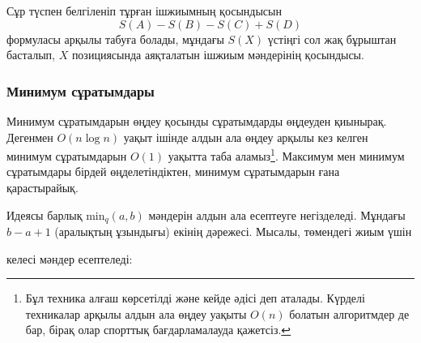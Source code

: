 Сұр түспен белгіленіп тұрған ішжиымның қосындысын
\[S(A) - S(B) - S(C) + S(D)\]
формуласы арқылы табуға болады,
мұндағы $S(X)$ үстіңгі сол жақ бұрыштан басталып,
$X$ позициясында аяқталатын ішжиым мәндерінің қосындысы. 

\subsubsection{Минимум сұратымдары}


Минимум сұратымдарын өңдеу қосынды сұратымдарды 
өңдеуден қиынырақ. Дегенмен $O(n \log n)$ уақыт ішінде
алдын ала өңдеу арқылы кез келген минимум сұратымдарын $O(1)$
уақытта таба аламыз\footnote{Бұл техника алғаш 
\cite{ben00} көрсетілді және кейде 
 әдісі деп аталады.
Күрделі техникалар \cite{fis06} арқылы алдын 
ала өңдеу уақыты $O(n)$ болатын алгоритмдер де бар, бірақ олар
спорттық бағдарламалауда қажетсіз.}.
Максимум мен минимум сұратымдары бірдей өңделетіндіктен,
минимум сұратымдарын ғана қарастырайық.

Идеясы барлық $\textrm{min}_q(a,b)$ мәндерін 
алдын ала есептеуге негізделеді. Мұндағы $b-a+1$ (аралықтың ұзындығы) 
екінің дәрежесі. 
Мысалы, төмендегі жиым үшін

\begin{center}
\end{center}
келесі мәндер есептеледі:

